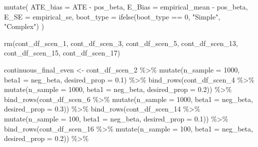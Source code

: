 \documentclass[
]{article}
\newenvironment{Shaded}{\begin{snugshade}}{\end{snugshade}}
\newcommand{\AttributeTok}[1]{\textcolor[rgb]{0.77,0.63,0.00}{#1}}
\newcommand{\DecValTok}[1]{\textcolor[rgb]{0.00,0.00,0.81}{#1}}
\newcommand{\FloatTok}[1]{\textcolor[rgb]{0.00,0.00,0.81}{#1}}
\newcommand{\FunctionTok}[1]{\textcolor[rgb]{0.00,0.00,0.00}{#1}}
\newcommand{\NormalTok}[1]{#1}
\newcommand{\OtherTok}[1]{\textcolor[rgb]{0.56,0.35,0.01}{#1}}
\newcommand{\SpecialCharTok}[1]{\textcolor[rgb]{0.00,0.00,0.00}{#1}}
\newcommand{\StringTok}[1]{\textcolor[rgb]{0.31,0.60,0.02}{#1}}
\begin{document}
\begin{Shaded}
\begin{Highlighting}[]
  \FunctionTok{mutate}\NormalTok{(}
    \AttributeTok{ATE\_bias =}\NormalTok{ ATE }\SpecialCharTok{{-}}\NormalTok{ pos\_beta,}
    \AttributeTok{E\_Bias =}\NormalTok{ empirical\_mean }\SpecialCharTok{{-}}\NormalTok{ pos\_beta,}
    \AttributeTok{E\_SE =}\NormalTok{ empirical\_se,}
    \AttributeTok{boot\_type =} \FunctionTok{ifelse}\NormalTok{(boot\_type }\SpecialCharTok{==} \DecValTok{0}\NormalTok{, }\StringTok{"Simple"}\NormalTok{, }\StringTok{"Complex"}\NormalTok{)}
\NormalTok{  ) }

\FunctionTok{rm}\NormalTok{(cont\_df\_scen\_1, cont\_df\_scen\_3, cont\_df\_scen\_5, cont\_df\_scen\_13, cont\_df\_scen\_15, cont\_df\_scen\_17)}
\end{Highlighting}
\end{Shaded}

\begin{Shaded}
\begin{Highlighting}[]
\NormalTok{continuous\_final\_even }\OtherTok{\textless{}{-}} 
\NormalTok{  cont\_df\_scen\_2 }\SpecialCharTok{\%\textgreater{}\%} \FunctionTok{mutate}\NormalTok{(}\AttributeTok{n\_sample =} \DecValTok{1000}\NormalTok{, }\AttributeTok{beta1 =}\NormalTok{ neg\_beta, }\AttributeTok{desired\_prop =} \FloatTok{0.1}\NormalTok{) }\SpecialCharTok{\%\textgreater{}\%} 
  \FunctionTok{bind\_rows}\NormalTok{(cont\_df\_scen\_4 }\SpecialCharTok{\%\textgreater{}\%} \FunctionTok{mutate}\NormalTok{(}\AttributeTok{n\_sample =} \DecValTok{1000}\NormalTok{, }\AttributeTok{beta1 =}\NormalTok{ neg\_beta, }\AttributeTok{desired\_prop =} \FloatTok{0.2}\NormalTok{)) }\SpecialCharTok{\%\textgreater{}\%} 
  \FunctionTok{bind\_rows}\NormalTok{(cont\_df\_scen\_6 }\SpecialCharTok{\%\textgreater{}\%} \FunctionTok{mutate}\NormalTok{(}\AttributeTok{n\_sample =} \DecValTok{1000}\NormalTok{, }\AttributeTok{beta1 =}\NormalTok{ neg\_beta, }\AttributeTok{desired\_prop =} \FloatTok{0.3}\NormalTok{)) }\SpecialCharTok{\%\textgreater{}\%} 
  \FunctionTok{bind\_rows}\NormalTok{(cont\_df\_scen\_14 }\SpecialCharTok{\%\textgreater{}\%} \FunctionTok{mutate}\NormalTok{(}\AttributeTok{n\_sample =} \DecValTok{100}\NormalTok{, }\AttributeTok{beta1 =}\NormalTok{ neg\_beta, }\AttributeTok{desired\_prop =} \FloatTok{0.1}\NormalTok{)) }\SpecialCharTok{\%\textgreater{}\%} 
  \FunctionTok{bind\_rows}\NormalTok{(cont\_df\_scen\_16 }\SpecialCharTok{\%\textgreater{}\%} \FunctionTok{mutate}\NormalTok{(}\AttributeTok{n\_sample =} \DecValTok{100}\NormalTok{, }\AttributeTok{beta1 =}\NormalTok{ neg\_beta, }\AttributeTok{desired\_prop =} \FloatTok{0.2}\NormalTok{)) }\SpecialCharTok{\%\textgreater{}\%} 

\end{Highlighting}
\end{Shaded}
\end{document}
